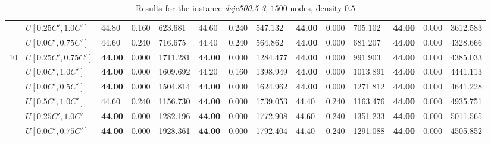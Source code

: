 \begin{table}[h]
{\begin{tabular}{|l|l||l|l|l||l|l|l||l|l|l||l|l|l|}
       & $U[0.25C',1.0C']$ & 44.80 & 0.160 & 623.681 & 44.60 & 0.240 & 547.132 			& \textbf{44.00} & 0.000 & 705.102 & \textbf{44.00} & 0.000 & 3612.583\\
       & $U[0.0C',0.75C']$ & 44.60 & 0.240 & 716.675 & 44.40 & 0.240 & 564.862 			& \textbf{44.00} & 0.000 & 681.207 & \textbf{44.00} & 0.000 & 4328.666\\
      \hline\hline
      \multirow{6}{*}{10}
       & $U[0.25C',0.75C']$ & \textbf{44.00} & 0.000 & 1711.281 & \textbf{44.00} & 0.000 & 1284.477 	& \textbf{44.00} & 0.000 & 991.903 & \textbf{44.00} & 0.000 & 4385.033\\
       & $U[0.0C',1.0C']$ & \textbf{44.00} & 0.000 & 1609.692 & 44.20 & 0.160 & 1398.949 				& \textbf{44.00} & 0.000 & 1013.891 & \textbf{44.00} & 0.000 & 4441.113\\
       & $U[0.0C',0.5C']$ & \textbf{44.00} & 0.000 & 1504.814 & \textbf{44.00} & 0.000 & 1624.962	 & \textbf{44.00} & 0.000 & 1271.812 & \textbf{44.00} & 0.000 & 4641.228\\
       & $U[0.5C',1.0C']$ & 44.60 & 0.240 & 1156.730 & \textbf{44.00} & 0.000 & 1739.053 				& 44.40 & 0.240 & 1163.476 & \textbf{44.00} & 0.000 & 4935.751\\
       & $U[0.25C',1.0C']$ & \textbf{44.00} & 0.000 & 1282.196 & \textbf{44.00} & 0.000 & 1772.908  & 44.60 & 0.240 & 1351.233 & \textbf{44.00} & 0.000 & 5011.565\\
       & $U[0.0C',0.75C']$ & \textbf{44.00} & 0.000 & 1928.361 & \textbf{44.00} & 0.000 & 1792.404 & 44.40 & 0.240 & 1291.088 & \textbf{44.00} & 0.000 & 4505.852\\
      \hline
      \end{tabular}
      }
      \caption{Results for the instance \textit{dsjc500.5-3}, $1500$ nodes, density $0.5$}
      \label{tab:in3}\end{table}


